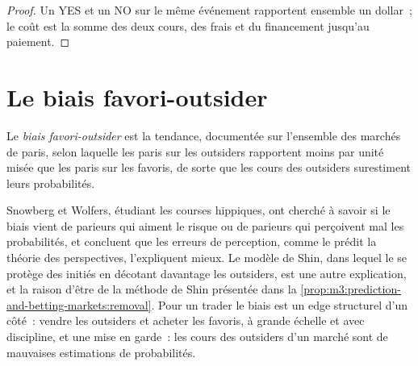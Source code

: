 \begin{proof}
Un YES et un NO sur le même événement rapportent ensemble un dollar~; le coût est la somme des deux cours, des frais et du financement jusqu'au paiement.
\end{proof}

\section{Le biais favori-outsider}

\begin{definition}\label{def:m3:prediction-and-betting-markets:flb}
Le \emph{biais favori-outsider} est la tendance, documentée sur l'ensemble des marchés de paris, selon laquelle les paris sur les outsiders
rapportent moins par unité misée que les paris sur les favoris, de sorte que les cours des outsiders surestiment leurs probabilités.
\end{definition}

Snowberg et Wolfers, étudiant les courses hippiques, ont cherché à savoir si le biais vient de parieurs qui aiment le risque ou de parieurs qui perçoivent mal les probabilités, et
concluent que les erreurs de perception, comme le prédit la théorie des perspectives, l'expliquent mieux. Le modèle de Shin, dans lequel le  se protège des initiés en décotant davantage
les outsiders, est une autre explication, et la raison d'être de la méthode de Shin présentée dans la \cref{prop:m3:prediction-and-betting-markets:removal}. Pour un trader le
biais est un edge structurel d'un côté~: vendre les outsiders et acheter les favoris, à grande échelle et avec discipline, et une mise en garde~: les cours des outsiders
d'un marché sont de mauvaises estimations de probabilités.

